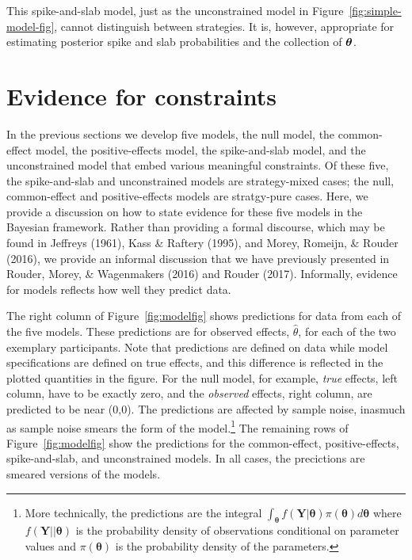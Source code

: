 \documentclass[english,man]{apa6}
\theoremstyle{definition}
\theoremstyle{definition}
\theoremstyle{remark}
\begin{document}
This spike-and-slab model, just as the unconstrained model in
Figure~\ref{fig:simple-model-fig}, cannot distinguish between
strategies. It is, however, appropriate for estimating posterior spike
and slab probabilities and the collection of \(\bm \theta\).

\section{Evidence for constraints}\label{evidence-for-constraints}

In the previous sections we develop five models, the null model, the
common-effect model, the positive-effects model, the spike-and-slab
model, and the unconstrained model that embed various meaningful
constraints. Of these five, the spike-and-slab and unconstrained models
are strategy-mixed cases; the null, common-effect and positive-effects
models are stratgy-pure cases. Here, we provide a discussion on how to
state evidence for these five models in the Bayesian framework. Rather
than providing a formal discourse, which may be found in Jeffreys
(1961), Kass \& Raftery (1995), and Morey, Romeijn, \& Rouder (2016), we
provide an informal discussion that we have previously presented in
Rouder, Morey, \& Wagenmakers (2016) and Rouder (2017). Informally,
evidence for models reflects how well they predict data.

The right column of Figure~\ref{fig:modelfig} shows predictions for data
from each of the five models. These predictions are for observed
effects, \(\hat{\theta}\), for each of the two exemplary participants.
Note that predictions are defined on data while model specifications are
defined on true effects, and this difference is reflected in the plotted
quantities in the figure. For the null model, for example, \emph{true}
effects, left column, have to be exactly zero, and the \emph{observed}
effects, right column, are predicted to be near (0,0). The predictions
are affected by sample noise, inasmuch as sample noise smears the form
of the model.\footnote{More technically, the predictions are the
  integral
  \(\int_{\bm{\theta}} f(\bm{Y}|\bm{\theta})\pi(\bm{\theta})d\bm{\theta}\)
  where \(f(\bm{Y}||\bm{\theta})\) is the probability density of
  observations conditional on parameter values and \(\pi(\bm{\theta})\)
  is the probability density of the parameters.} The remaining rows of
Figure~\ref{fig:modelfig} show the predictions for the common-effect,
positive-effects, spike-and-slab, and unconstrained models. In all
cases, the precictions are smeared versions of the models.
\end{document}
